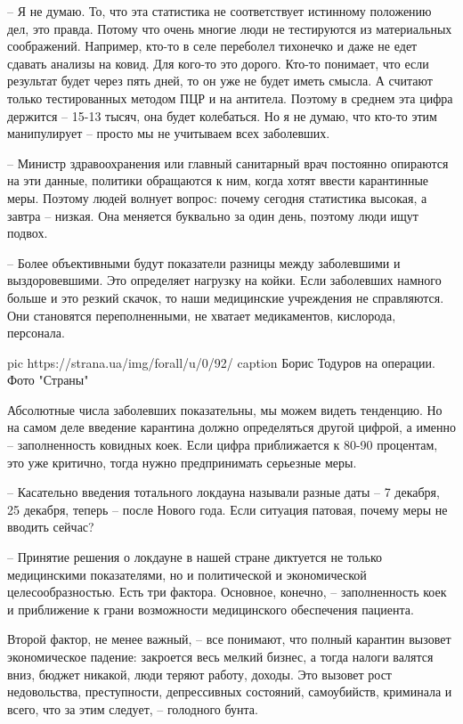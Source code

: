 – Я не думаю. То, что эта статистика не соответствует истинному положению дел,
это правда. Потому что очень многие люди не тестируются из материальных
соображений. Например, кто-то в селе переболел тихонечко и даже не едет сдавать
анализы на ковид. Для кого-то это дорого. Кто-то понимает, что если результат
будет через пять дней, то он уже не будет иметь смысла. А считают только
тестированных методом ПЦР и на антитела. Поэтому в среднем эта цифра держится –
15-13 тысяч, она будет колебаться. Но я не думаю, что кто-то этим манипулирует
– просто мы не учитываем всех заболевших. 

– Министр здравоохранения или главный санитарный врач постоянно опираются на
эти данные, политики обращаются к ним, когда хотят ввести карантинные меры.
Поэтому людей волнует вопрос: почему сегодня статистика высокая, а завтра –
низкая. Она меняется буквально за один день, поэтому люди ищут подвох. 

– Более объективными будут показатели разницы между заболевшими и
выздоровевшими. Это определяет нагрузку на койки. Если заболевших намного
больше и это резкий скачок, то наши медицинские учреждения не справляются. Они
становятся переполненными, не хватает медикаментов, кислорода, персонала.

\ifcmt
pic https://strana.ua/img/forall/u/0/92/%
caption Борис Тодуров на операции. Фото "Страны" 
\fi

Абсолютные числа заболевших показательны, мы можем видеть тенденцию. Но на
самом деле введение карантина должно определяться другой цифрой, а именно –
заполненность ковидных коек. Если цифра приближается к 80-90 процентам, это уже
критично, тогда нужно предпринимать серьезные меры. 

– Касательно введения тотального локдауна называли разные даты – 7 декабря, 25
декабря, теперь – после Нового года. Если ситуация патовая, почему меры не
вводить сейчас? 

– Принятие решения о локдауне в нашей стране диктуется не только медицинскими
показателями, но и политической и экономической целесообразностью. Есть три
фактора. Основное, конечно, – заполненность коек и приближение к грани
возможности медицинского обеспечения пациента.

Второй фактор, не менее важный, – все понимают, что полный карантин вызовет
экономическое падение: закроется весь мелкий бизнес, а тогда налоги валятся
вниз, бюджет никакой, люди теряют работу, доходы. Это вызовет рост
недовольства, преступности, депрессивных состояний, самоубийств, криминала и
всего, что за этим следует, – голодного бунта. 

